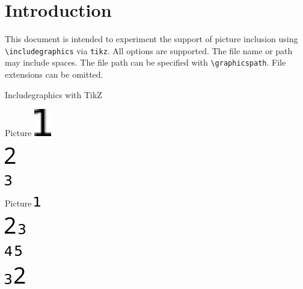 \documentclass{article}
\begin{document}
\section*{Introduction}

This document is intended to experiment the support of picture inclusion using 
\verb|\includegraphics| via \texttt{tikz}. All options are supported. The file 
name or path may include spaces. The file path can be specified with 
\verb|\graphicspath|. File extensions can be omitted.

\begin{quiz}{Includegraphics with TikZ}

\begin{multi}{Picture}
\includegraphics[width=2em,angle=90]{fig/1 1.PNG}
\item* \includegraphics[scale=.5]{fig/2 2.pdf}
\item \includegraphics{fig/3.png}
\end{multi}

\graphicspath{{./fig/}}
\begin{matching}[dd]{Picture}
\includegraphics{1 1}
\item \includegraphics[angle=45]{2 2} \answer \includegraphics{3}
\item \includegraphics[angle=-45]{4} \answer \includegraphics{5}
\item \includegraphics[scale=2]{3} \answer 
\includegraphics[angle=-180,scale=2]{2 2}
\end{matching}

\end{quiz}
\end{document}
